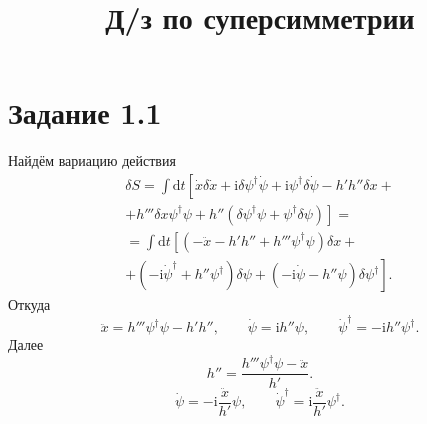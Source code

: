 \documentclass[a4paper, 14pt]{extarticle}
\title{Д/з по суперсимметрии}
\begin{document}
	\maketitle
\section*{Задание 1.1}
\begin{hiProb}[Задача 1]
\end{hiProb}
\begin{sol}
Найдём вариацию действия
\begin{multline*}
	\delta S= \int \mathrm{d} t \left[ 
	\dot{x} \delta \dot{x} + \mathrm{i} 
\delta \psi^\dagger \dot{\psi} + \mathrm{i} \psi^\dagger
\delta \dot{\psi} -h' h''
\delta x \right. + \\ + \left. h''' \delta x \psi^\dagger
\psi + h''\left( \delta \psi^\dagger \psi+ \psi^\dagger
\delta \psi\right) \right] =\\=
\int \mathrm{d} t \left[ 
\left(-\ddot{x}-h'h''+h''' \psi^\dagger \psi\right)\delta x\right. + \\ + \left.\left( -\mathrm{i} \dot{\psi}^\dagger+ h'' \psi^\dagger \right) \delta \psi+\left( -\mathrm{i} \dot{\psi}-h''\psi  \right)\delta\psi^\dagger  \right] 
.\end{multline*} 
Откуда
\[
\ddot{x}= h''' \psi^\dagger \psi-h' h'' ,\qquad
\dot{\psi}=\mathrm{i} h'' \psi,\qquad
\dot{\psi}^\dagger=-\mathrm{i} h'' \psi^\dagger
.\] 
Далее
\[
h''= \frac{h'''\psi^\dagger \psi-\ddot{x}}{h'}
.\] 
\[
\dot{\psi}=-\mathrm{i} \frac{\ddot{x}}{h'}\psi,\qquad
\dot{\psi}^\dagger=  \mathrm{i} \frac{\ddot{x}}{h'} \psi^\dagger
.\] 

\end{sol}
\end{document}
